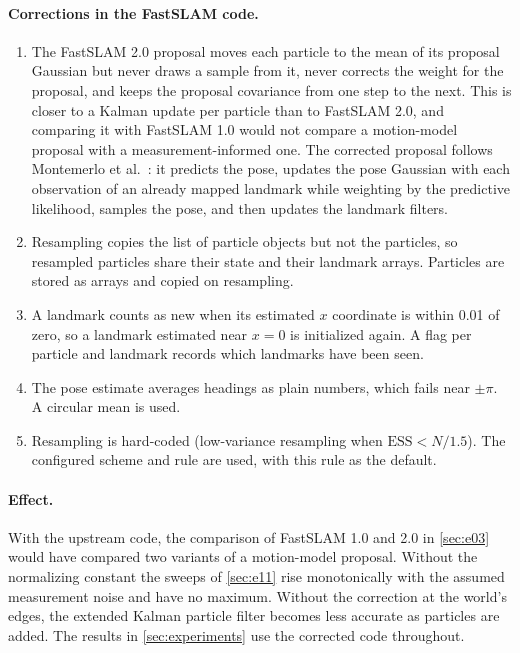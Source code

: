 \paragraph{Corrections in the FastSLAM code.}
\begin{enumerate}
  \item The FastSLAM 2.0 proposal moves each particle to the mean of its proposal Gaussian but never draws a sample from
        it, never corrects the weight for the proposal, and keeps the proposal covariance from one step to the next. This
        is closer to a Kalman update per particle than to FastSLAM 2.0, and comparing it with FastSLAM 1.0 would not compare
        a motion-model proposal with a measurement-informed one. The corrected proposal follows Montemerlo et al.\
        \cite{montemerlo2003fastslam2}: it predicts the pose, updates the pose Gaussian with each observation of an already
        mapped landmark while weighting by the predictive likelihood, samples the pose, and then updates the landmark filters.
  \item Resampling copies the list of particle objects but not the particles, so resampled particles share their state and
        their landmark arrays. Particles are stored as arrays and copied on resampling.
  \item A landmark counts as new when its estimated $x$ coordinate is within 0.01 of zero, so a landmark estimated near
        $x = 0$ is initialized again. A flag per particle and landmark records which landmarks have been seen.
  \item The pose estimate averages headings as plain numbers, which fails near $\pm\pi$. A circular mean is used.
  \item Resampling is hard-coded (low-variance resampling when $\mathrm{ESS} < N / 1.5$). The configured scheme and rule
        are used, with this rule as the default.
\end{enumerate}

\paragraph{Effect.} With the upstream code, the comparison of FastSLAM 1.0 and 2.0 in \cref{sec:e03} would have compared
two variants of a motion-model proposal. Without the normalizing constant the sweeps of \cref{sec:e11} rise
monotonically with the assumed measurement noise and have no maximum. Without the correction at the world's edges, the extended Kalman particle filter
becomes less accurate as particles are added. The results in \cref{sec:experiments} use the corrected code throughout.
